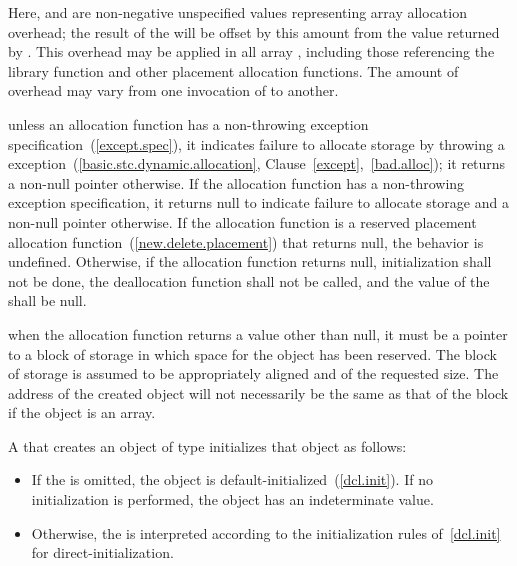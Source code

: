 Here,  and  are non-negative unspecified values
representing array allocation overhead; the result of the
 will be offset by this amount from the value
returned by . This overhead may be applied in all
array , including those referencing the
library function  and other
placement allocation functions. The amount of overhead may vary from one
invocation of  to another.
\exitexample 

\pnum
\enternote 
unless an allocation function has a non-throwing
exception specification~(\ref{except.spec}),
it indicates failure to allocate storage by throwing a
%
%
 exception~(\ref{basic.stc.dynamic.allocation},
Clause~\ref{except},~\ref{bad.alloc});
it returns a non-null pointer otherwise. If the allocation function
has a non-throwing exception specification,
it returns null to indicate failure to allocate storage
and a non-null pointer otherwise.
\exitnote 
If the allocation function is a reserved placement allocation
function~(\ref{new.delete.placement}) that returns null,
the behavior is undefined.
Otherwise,
if the allocation function returns null, initialization shall not be
done, the deallocation function shall not be called, and the value of
the  shall be null.

\pnum
\enternote 
when the allocation function returns a value other than null, it must be
a pointer to a block of storage in which space for the object has been
reserved. The block of storage is assumed to be appropriately aligned
and of the requested size. The address of the created object will not
necessarily be the same as that of the block if the object is an array.
\exitnote 

\pnum
{}%
%
%
%
%
%
%
A  that creates an object of type 
initializes that object as follows:

\begin{itemize}
\item If the  is omitted, the object is
default-initialized~(\ref{dcl.init}). \enternote If no initialization
is performed, the object has an indeterminate value. \exitnote

\item Otherwise, the  is interpreted according to
the initialization rules of~\ref{dcl.init} for direct-initialization.
\end{itemize}

